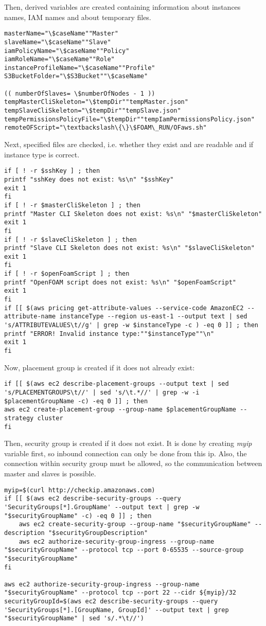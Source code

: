 \documentclass[11pt,english]{article}
\begin{document}
Then, derived variables are created containing information about instances names, IAM names and about temporary files.
\begin{lstlisting}
masterName="\$caseName""Master"
slaveName="\$caseName""Slave"
iamPolicyName="\$caseName""Policy"
iamRoleName="\$caseName""Role"
instanceProfileName="\$caseName""Profile"
S3BucketFolder="\$S3Bucket""\$caseName"

(( numberOfSlaves= \$numberOfNodes - 1 ))
tempMasterCliSkeleton="\$tempDir""tempMaster.json"
tempSlaveCliSkeleton="\$tempDir""tempSlave.json"
tempPermissionsPolicyFile="\$tempDir""tempIamPermissionsPolicy.json"
remoteOFScript="\textbackslash\{\}\$FOAM\_RUN/OFaws.sh"
\end{lstlisting}
Next, specified files are checked, i.e. whether they exist and are readable and if instance type is correct.
\begin{lstlisting}
if [ ! -r $sshKey ] ; then
printf "sshKey does not exist: %s\n" "$sshKey"
exit 1
fi
if [ ! -r $masterCliSkeleton ] ; then
printf "Master CLI Skeleton does not exist: %s\n" "$masterCliSkeleton"
exit 1
fi
if [ ! -r $slaveCliSkeleton ] ; then
printf "Slave CLI Skeleton does not exist: %s\n" "$slaveCliSkeleton"
exit 1
fi
if [ ! -r $openFoamScript ] ; then
printf "OpenFOAM script does not exist: %s\n" "$openFoamScript"
exit 1
fi
if [[ $(aws pricing get-attribute-values --service-code AmazonEC2 --attribute-name instanceType --region us-east-1 --output text | sed 's/ATTRIBUTEVALUES\t//g' | grep -w $instanceType -c ) -eq 0 ]] ; then
printf "ERROR! Invalid instance type:""$instanceType""\n"
exit 1
fi
\end{lstlisting}
Now, placement group is created if it does not already exist:
\begin{lstlisting}
if [[ $(aws ec2 describe-placement-groups --output text | sed 's/PLACEMENTGROUPS\t//' | sed 's/\t.*//' | grep -w -i $placementGroupName -c) -eq 0 ]] ; then
aws ec2 create-placement-group --group-name $placementGroupName --strategy cluster
fi
\end{lstlisting}
Then, security group is created if it does not exist. It is done by creating \textit{myip} variable first, so inbound connection can only be done from this ip. Also, the connection within security group must be allowed, so the communication between master and slaves is possible.
\begin{lstlisting}
myip=$(curl http://checkip.amazonaws.com)
if [[ $(aws ec2 describe-security-groups --query 'SecurityGroups[*].GroupName' --output text | grep -w "$securityGroupName" -c) -eq 0 ]] ; then
	aws ec2 create-security-group --group-name "$securityGroupName" --description "$securityGroupDescription"
	aws ec2 authorize-security-group-ingress --group-name "$securityGroupName" --protocol tcp --port 0-65535 --source-group "$securityGroupName"
fi

aws ec2 authorize-security-group-ingress --group-name "$securityGroupName" --protocol tcp --port 22 --cidr ${myip}/32
securityGroupId=$(aws ec2 describe-security-groups --query 'SecurityGroups[*].[GroupName, GroupId]' --output text | grep "$securityGroupName" | sed 's/.*\t//')
\end{lstlisting}
\end{document}

